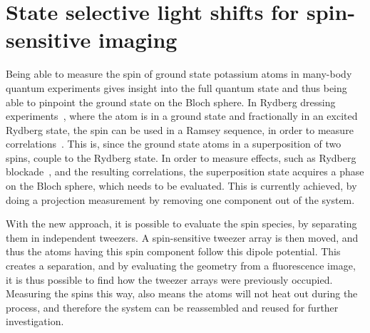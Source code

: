 \chapter{State selective light shifts for spin-sensitive imaging}%
\label{ch:spin_resolved}


Being able to measure the spin of ground state potassium atoms in many-body quantum experiments gives insight into the full quantum state and thus being able to pinpoint the ground state on the Bloch sphere. In Rydberg dressing experiments~\cite{Zeiher2016, Borish2020}, where the atom is in a ground state and fractionally in an excited Rydberg state, the spin can be used in a Ramsey sequence, in order to measure correlations~\cite{Boll2016, Zeiher2017}.
This is, since the ground state atoms in a superposition of two spins, couple to the Rydberg state. In order to measure effects, such as Rydberg blockade~\cite{Urban2009}, and the resulting correlations, the superposition state acquires a phase on the Bloch sphere, which needs to be evaluated. This is currently achieved, by doing a projection measurement by removing one component out of the system.

With the new approach, it is possible to evaluate the spin species, by separating them in independent tweezers. A spin-sensitive tweezer array is then moved, and thus the atoms having this spin component follow this dipole potential. This creates a separation, and by evaluating the geometry from a fluorescence image, it is thus possible to find how the tweezer arrays were previously occupied. Measuring the spins this way, also means the atoms will not heat out during the process, and therefore the system can be reassembled and reused for further investigation.

